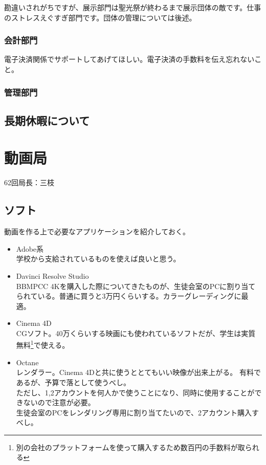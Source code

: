 \documentclass[dvipdfmx,jb5]{jarticle}
\begin{document}
勘違いされがちですが、展示部門は聖光祭が終わるまで展示団体の敵です。仕事のストレスえぐすぎ部門です。団体の管理については後述。

\subsubsection{会計部門}
電子決済関係でサポートしてあげてほしい。電子決済の手数料を伝え忘れないこと。

\subsubsection{管理部門}

\subsection{長期休暇について}


\section{動画局}
62回局長：三枝
\subsection{ソフト}
 動画を作る上で必要なアプリケーションを紹介しておく。
 \begin{itemize}
  \item Adobe系\\
  学校から支給されているものを使えば良いと思う。
  \item Davinci Resolve Studio\\
  BBMPCC 4Kを購入した際についてきたものが、生徒会室のPCに割り当てられている。普通に買うと3万円くらいする。カラーグレーディングに最適。
  \item Cinema 4D\\
  CGソフト。40万くらいする映画にも使われているソフトだが、学生は実質無料\footnote{別の会社のプラットフォームを使って購入するため数百円の手数料が取られる}で使える。
  \item Octane\\
  レンダラー。Cinema 4Dと共に使うととてもいい映像が出来上がる。
  有料であるが、予算で落として使うべし。\\ただし、1,2アカウントを何人かで使うことになり、同時に使用することができないので注意が必要。\\生徒会室のPCをレンダリング専用に割り当てたいので、2アカウント購入すべし。
 \end{itemize}
\end{document}
